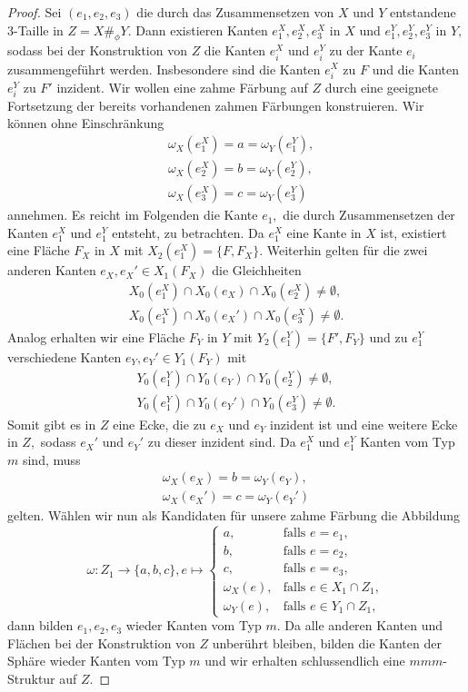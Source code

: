 \documentclass[12pt,titlepage,twoside,cleardoublepage]{article}
\theoremstyle{nummermitklammern}
\numberwithin{equation}{section}
\begin{document}
\begin{proof}
 Sei  $(e_1,e_2,e_3)$ die durch das Zusammensetzen von $X$ und $Y$ entstandene 3-Taille in $Z=X\#_{\phi}Y$. Dann existieren Kanten $e^X_1,e^X_2,e_3^X$ in $X$ und $e^Y_1,e^Y_2,e_3^Y$ in $Y,$ sodass bei der Konstruktion von $Z$ die Kanten $e_i^X$ und $e_i^Y$ zu der Kante $e_i$ zusammengeführt werden. Insbesondere sind die Kanten $e_i^X$ zu $F$ und die Kanten $e_i^Y$ zu $F'$ inzident. Wir wollen eine zahme Färbung auf $Z$ durch eine geeignete Fortsetzung der bereits vorhandenen zahmen Färbungen konstruieren.  
Wir können ohne Einschränkung 
\begin{align*}
&\omega_X(e_1^X)=a=\omega_Y(e_1^Y),\\
&\omega_X(e_2^X)=b=\omega_Y(e_2^Y),\\
&\omega_X(e_3^X)=c=\omega_Y(e_3^Y)
\end{align*}
annehmen. Es reicht im Folgenden die Kante $e_1,$ die durch Zusammensetzen der Kanten $e_1^X$ und $e_1^Y$ entsteht, zu betrachten. Da $e_1^X$ eine Kante in $X$ ist, existiert eine Fläche $F_X$ in $X$ mit $X_2(e_1^X)=\{F,F_X\}$. Weiterhin gelten für die zwei anderen Kanten $e_X,e_X'\in X_1(F_X) $ die Gleichheiten
\begin{align*}
X_0(e_1^X)\cap X_0(e_X) \cap X_0(e_2^X)\neq \emptyset,\\
X_0(e_1^X)\cap X_0(e_X') \cap X_0(e_3^X)\neq \emptyset.
\end{align*}
 Analog erhalten wir eine Fläche $F_Y$ in $Y$ mit $Y_2(e_1^Y)=\{F',F_Y\}$ und zu $e_1^Y$ verschiedene Kanten $e_Y,e_Y'\in Y_1(F_Y)$ mit 
\begin{align*}
Y_0(e_1^Y)\cap Y_0(e_Y) \cap Y_0(e_2^Y)\neq \emptyset,\\
Y_0(e_1^Y)\cap Y_0(e_Y') \cap Y_0(e_3^Y)\neq \emptyset.
\end{align*}
Somit gibt es in $Z$ eine Ecke, die zu $e_X$ und $e_Y$ inzident ist und eine weitere Ecke in $Z,$ sodass  $e_X'$ und $e_Y'$ zu dieser inzident sind.
Da $e_1^X$ und $e_1^Y$ Kanten vom Typ $m$ sind, muss 
\begin{align*}
\omega_X(e_X)=b=\omega_Y(e_Y),\\
\omega_X(e_X')=c=\omega_Y(e_Y')
\end{align*}
gelten.
Wählen wir nun als Kandidaten für unsere zahme Färbung die Abbildung
\[
\omega: Z_1 \to\{a,b,c\},e\mapsto
 \begin{cases}
 a,&\text{falls }e=e_1,\\
 b,&\text{falls }e=e_2, \\
 c,&\text{falls } e=e_3,\\
 \omega_X(e),&\text{falls }e \in X_1\cap Z_1,\\
 \omega_Y(e),&\text{falls }e\in Y_1 \cap Z_1,
 \end{cases}
\]
dann bilden $e_1,e_2,e_3$ wieder Kanten vom Typ $m$. Da alle anderen Kanten und Flächen bei der Konstruktion von $Z$ unberührt bleiben, bilden die Kanten der Sphäre wieder Kanten vom Typ $m$ und wir erhalten schlussendlich eine $mmm$-Struktur auf $Z.$  

\end{proof}
\end{document}
